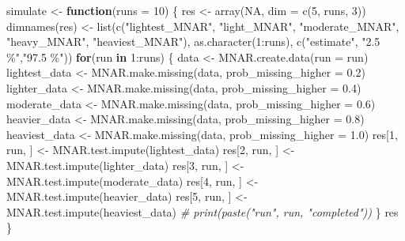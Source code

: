 \documentclass[
]{article}
\newenvironment{Shaded}{\begin{snugshade}}{\end{snugshade}}
\newcommand{\AttributeTok}[1]{\textcolor[rgb]{0.77,0.63,0.00}{#1}}
\newcommand{\CommentTok}[1]{\textcolor[rgb]{0.56,0.35,0.01}{\textit{#1}}}
\newcommand{\ConstantTok}[1]{\textcolor[rgb]{0.00,0.00,0.00}{#1}}
\newcommand{\ControlFlowTok}[1]{\textcolor[rgb]{0.13,0.29,0.53}{\textbf{#1}}}
\newcommand{\DecValTok}[1]{\textcolor[rgb]{0.00,0.00,0.81}{#1}}
\newcommand{\FloatTok}[1]{\textcolor[rgb]{0.00,0.00,0.81}{#1}}
\newcommand{\FunctionTok}[1]{\textcolor[rgb]{0.00,0.00,0.00}{#1}}
\newcommand{\NormalTok}[1]{#1}
\newcommand{\OtherTok}[1]{\textcolor[rgb]{0.56,0.35,0.01}{#1}}
\newcommand{\SpecialCharTok}[1]{\textcolor[rgb]{0.00,0.00,0.00}{#1}}
\newcommand{\StringTok}[1]{\textcolor[rgb]{0.31,0.60,0.02}{#1}}
\begin{document}
\begin{Shaded}
\begin{Highlighting}[]
\NormalTok{simulate }\OtherTok{\textless{}{-}} \ControlFlowTok{function}\NormalTok{(}\AttributeTok{runs =} \DecValTok{10}\NormalTok{) \{}
\NormalTok{  res }\OtherTok{\textless{}{-}} \FunctionTok{array}\NormalTok{(}\ConstantTok{NA}\NormalTok{, }\AttributeTok{dim =} \FunctionTok{c}\NormalTok{(}\DecValTok{5}\NormalTok{, runs, }\DecValTok{3}\NormalTok{))}
  \FunctionTok{dimnames}\NormalTok{(res) }\OtherTok{\textless{}{-}} \FunctionTok{list}\NormalTok{(}\FunctionTok{c}\NormalTok{(}\StringTok{"lightest\_MNAR"}\NormalTok{, }\StringTok{"light\_MNAR"}\NormalTok{, }\StringTok{"moderate\_MNAR"}\NormalTok{, }\StringTok{"heavy\_MNAR"}\NormalTok{, }\StringTok{"heaviest\_MNAR"}\NormalTok{),}
                        \FunctionTok{as.character}\NormalTok{(}\DecValTok{1}\SpecialCharTok{:}\NormalTok{runs),}
                        \FunctionTok{c}\NormalTok{(}\StringTok{"estimate"}\NormalTok{, }\StringTok{"2.5 \%"}\NormalTok{,}\StringTok{"97.5 \%"}\NormalTok{))}
  \ControlFlowTok{for}\NormalTok{(run }\ControlFlowTok{in} \DecValTok{1}\SpecialCharTok{:}\NormalTok{runs) \{}
\NormalTok{    data }\OtherTok{\textless{}{-}} \FunctionTok{MNAR.create.data}\NormalTok{(}\AttributeTok{run =}\NormalTok{ run)}
\NormalTok{    lightest\_data }\OtherTok{\textless{}{-}} \FunctionTok{MNAR.make.missing}\NormalTok{(data, }\AttributeTok{prob\_missing\_higher =} \FloatTok{0.2}\NormalTok{)}
\NormalTok{    lighter\_data }\OtherTok{\textless{}{-}} \FunctionTok{MNAR.make.missing}\NormalTok{(data, }\AttributeTok{prob\_missing\_higher =} \FloatTok{0.4}\NormalTok{)}
\NormalTok{    moderate\_data }\OtherTok{\textless{}{-}} \FunctionTok{MNAR.make.missing}\NormalTok{(data, }\AttributeTok{prob\_missing\_higher =} \FloatTok{0.6}\NormalTok{)}
\NormalTok{    heavier\_data }\OtherTok{\textless{}{-}} \FunctionTok{MNAR.make.missing}\NormalTok{(data, }\AttributeTok{prob\_missing\_higher =} \FloatTok{0.8}\NormalTok{)}
\NormalTok{    heaviest\_data }\OtherTok{\textless{}{-}} \FunctionTok{MNAR.make.missing}\NormalTok{(data, }\AttributeTok{prob\_missing\_higher =} \FloatTok{1.0}\NormalTok{)}
\NormalTok{    res[}\DecValTok{1}\NormalTok{, run, ] }\OtherTok{\textless{}{-}} \FunctionTok{MNAR.test.impute}\NormalTok{(lightest\_data)}
\NormalTok{    res[}\DecValTok{2}\NormalTok{, run, ] }\OtherTok{\textless{}{-}} \FunctionTok{MNAR.test.impute}\NormalTok{(lighter\_data)}
\NormalTok{    res[}\DecValTok{3}\NormalTok{, run, ] }\OtherTok{\textless{}{-}} \FunctionTok{MNAR.test.impute}\NormalTok{(moderate\_data)}
\NormalTok{    res[}\DecValTok{4}\NormalTok{, run, ] }\OtherTok{\textless{}{-}} \FunctionTok{MNAR.test.impute}\NormalTok{(heavier\_data)}
\NormalTok{    res[}\DecValTok{5}\NormalTok{, run, ] }\OtherTok{\textless{}{-}} \FunctionTok{MNAR.test.impute}\NormalTok{(heaviest\_data)}
    \CommentTok{\# print(paste("run", run,  "completed"))}
\NormalTok{  \}}
\NormalTok{  res}
\NormalTok{\}}
\end{Highlighting}
\end{Shaded}
\end{document}
